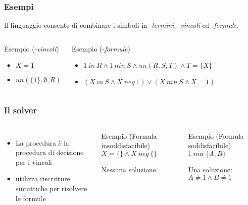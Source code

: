 \documentclass{beamer}
\begin{document}

\begin{frame}
  \frametitle{Esempi} Il linguaggio \lset{} consente di combinare i
  simboli in \lset{}-\textit{termini}, \lset{}-\textit{vincoli} ed
  \lset{}-\textit{formule}.
  \begin{columns}[c]
    \begin{exampleblock}{Esempio (\lset{}-\textit{vincoli})}
      \begin{itemize}
      \item $X = 1$
      \item $un(\{1\}, \emptyset, R)$
      \end{itemize}
    \end{exampleblock}
    \begin{exampleblock}{Esempio (\lset{}-\textit{formule})}
      \begin{itemize}
      \item $1\ in\ R \land 1\ nin\ S \land un(R,S,T) \land T = \{X\}$
      \item $(X\ in\ S \land X\ neq\ 1) \lor (X\ nin\ S \land X = 1)$
      \end{itemize}
    \end{exampleblock}
  \end{columns}
\end{frame}


\begin{frame}
  \frametitle{Il solver \satset{}}
  \begin{columns}[c]

    \begin{itemize}
    \item La procedura \satset{} è la procedura di decisione per i
      vincoli
    \item \satset{} utilizza riscritture sintattiche per risolvere le
      formule
    \end{itemize}

    \begin{exampleblock}{Esempio (Formula insoddisfacibile)}
      $X = \{\} \land X\ neq\ \{\}$
      
      Nessuna soluzione.
    \end{exampleblock}
    \begin{exampleblock}{Esempio (Formula soddisfacibile)}
      $1\ nin\ \{A, B\}$
      
      Una soluzione: $A \neq 1 \land B \neq 1$
    \end{exampleblock}
  \end{columns}
\end{frame}
\end{document}
